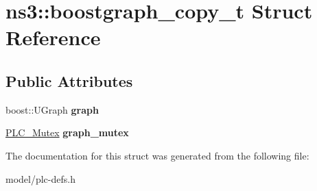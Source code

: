 \hypertarget{structns3_1_1boostgraph__copy__t}{\section{ns3\-:\-:boostgraph\-\_\-copy\-\_\-t \-Struct \-Reference}
\label{structns3_1_1boostgraph__copy__t}
}
\subsection*{\-Public \-Attributes}
\begin{DoxyCompactItemize}
\item 
\hypertarget{structns3_1_1boostgraph__copy__t_a8e64818702f182ab02e666352dd88299}{boost\-::\-U\-Graph {\bfseries graph}}\label{structns3_1_1boostgraph__copy__t_a8e64818702f182ab02e666352dd88299}

\item 
\hypertarget{structns3_1_1boostgraph__copy__t_a12387d3134753137a7e72d7ffb212193}{\hyperlink{structns3_1_1PLC__Mutex}{\-P\-L\-C\-\_\-\-Mutex} {\bfseries graph\-\_\-mutex}}\label{structns3_1_1boostgraph__copy__t_a12387d3134753137a7e72d7ffb212193}

\end{DoxyCompactItemize}


\-The documentation for this struct was generated from the following file\-:\begin{DoxyCompactItemize}
\item 
model/plc-\/defs.\-h\end{DoxyCompactItemize}

